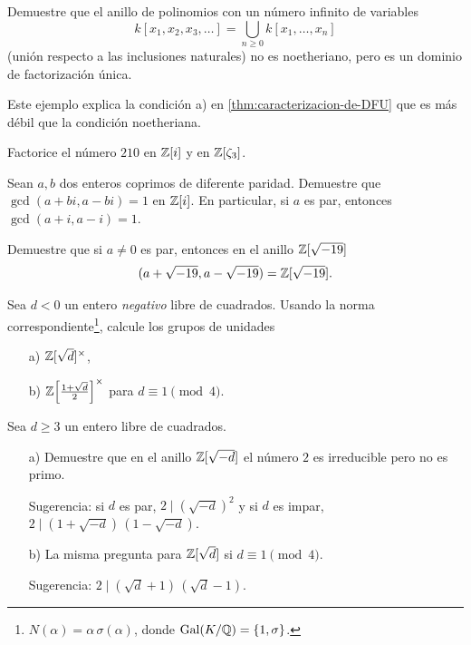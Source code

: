 \begin{ejercicio}
  Demuestre que el anillo de polinomios con un número infinito de variables
  $$k [x_1,x_2,x_3,\ldots] = \bigcup_{n\ge 0} k [x_1,\ldots,x_n]$$
  (unión respecto a las inclusiones naturales) no es noetheriano, pero es un
  dominio de factorización única.

  Este ejemplo explica la condición a) en \ref{thm:caracterizacion-de-DFU} que
  es más débil que la condición noetheriana.
\end{ejercicio}

\begin{ejercicio}
  Factorice el número $210$ en $\mathbb{Z} [i]$ y en $\mathbb{Z} [\zeta_3]$.
\end{ejercicio}

\begin{ejercicio}
  Sean $a,b$ dos enteros coprimos de diferente paridad. Demuestre que
  $\gcd (a + bi, a - bi) = 1$ en $\mathbb{Z} [i]$. En particular, si $a$ es par,
  entonces $\gcd (a + i, a - i) = 1$.
\end{ejercicio}

\begin{ejercicio}
  Demuestre que si $a \ne 0$ es par, entonces en el anillo $\mathbb{Z} [\sqrt{-19}]$
  $$(a + \sqrt{-19}, a - \sqrt{-19}) = \mathbb{Z} [\sqrt{-19}].$$
\end{ejercicio}

\begin{ejercicio}
  Sea $d < 0$ un entero \emph{negativo} libre de cuadrados. Usando la norma
  correspondiente\footnote{$N (\alpha) = \alpha\,\sigma (\alpha)$, donde
    $\operatorname{Gal} (K/\mathbb{Q}) = \{ 1, \sigma \}$.}, calcule los grupos de unidades

  \begin{enumerate}
  \item[a)] $\mathbb{Z} [\sqrt{d}]^\times$,
  \item[b)] $\mathbb{Z} \Bigl[\frac{1+\sqrt{d}}{2}\Bigr]^\times$ para
    $d \equiv 1 \pmod{4}$.
  \end{enumerate}
\end{ejercicio}

\begin{ejercicio}
  Sea $d \ge 3$ un entero libre de cuadrados.

  \begin{enumerate}
    \item[a)] Demuestre que en el anillo $\mathbb{Z} [\sqrt{-d}]$ el número $2$ es
      irreducible pero no es primo.

      Sugerencia: si $d$ es par, $2 \mid (\sqrt{-d})^2$ y si $d$ es impar,
      $2 \mid (1 + \sqrt{-d})\,(1 - \sqrt{-d})$.

    \item[b)] La misma pregunta para $\mathbb{Z} [\sqrt{d}]$ si $d \equiv 1 \pmod{4}$.

      Sugerencia: $2 \mid (\sqrt{d} + 1)\,(\sqrt{d} - 1)$.
  \end{enumerate}
\end{ejercicio}

